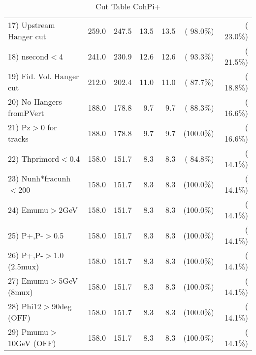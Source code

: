 \begin{table}[h!]
\begin{tabular}{||l||r|r|r|r|r|r||}
 17) Upstream Hanger cut  &        259.0 &        247.5 &         13.5 &         13.5 & ( 98.0\%) & ( 23.0\%) \\
 18) nsecond$<$4          &        241.0 &        230.9 &         12.6 &         12.6 & ( 93.3\%) & ( 21.5\%) \\
 19) Fid. Vol. Hanger cut &        212.0 &        202.4 &         11.0 &         11.0 & ( 87.7\%) & ( 18.8\%) \\
 20) No Hangers fromPVert &        188.0 &        178.8 &          9.7 &          9.7 & ( 88.3\%) & ( 16.6\%) \\
 21) Pz$>$0 for tracks    &        188.0 &        178.8 &          9.7 &          9.7 & (100.0\%) & ( 16.6\%) \\
 22) Thprimord$<$0.4      &        158.0 &        151.7 &          8.3 &          8.3 & ( 84.8\%) & ( 14.1\%) \\
 23) Nunh*fracunh$<$200   &        158.0 &        151.7 &          8.3 &          8.3 & (100.0\%) & ( 14.1\%) \\
 24) Emumu$>$2GeV         &        158.0 &        151.7 &          8.3 &          8.3 & (100.0\%) & ( 14.1\%) \\
 25) P+,P-$>$0.5          &        158.0 &        151.7 &          8.3 &          8.3 & (100.0\%) & ( 14.1\%) \\
 26) P+,P-$>$1.0 (2.5mux) &        158.0 &        151.7 &          8.3 &          8.3 & (100.0\%) & ( 14.1\%) \\
 27) Emumu$>$5GeV  (8mux) &        158.0 &        151.7 &          8.3 &          8.3 & (100.0\%) & ( 14.1\%) \\
 28) Phi12$>$90deg  (OFF) &        158.0 &        151.7 &          8.3 &          8.3 & (100.0\%) & ( 14.1\%) \\
 29) Pmumu$>$10GeV  (OFF) &        158.0 &        151.7 &          8.3 &          8.3 & (100.0\%) & ( 14.1\%) \\
 \hline
 \hline
 \end{tabular}
 \caption{Cut Table  CohPi+   }
 \label{tab-cutcohjpsi-mumu_nuecc}
 \end{table}
